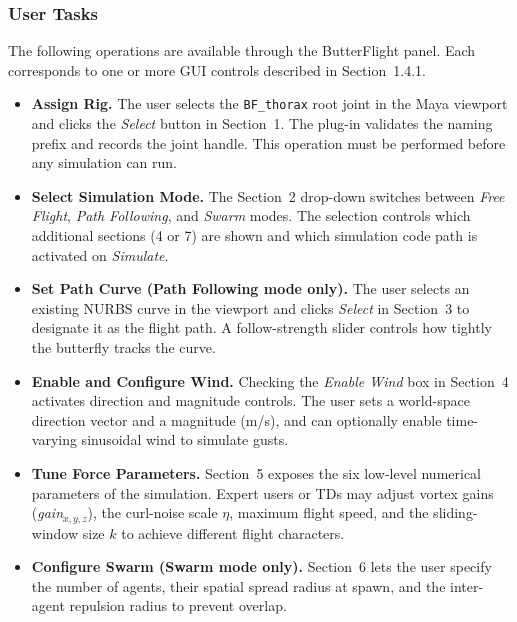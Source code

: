 \documentclass[12pt]{article}
\begin{document}
\subsubsection{User Tasks}

The following operations are available through the ButterFlight panel. Each corresponds
to one or more GUI controls described in Section~1.4.1.

\begin{itemize}
  \item \textbf{Assign Rig.} The user selects the \texttt{BF\_thorax} root joint in the
    Maya viewport and clicks the \textit{Select} button in Section~1. The plug-in validates
    the naming prefix and records the joint handle. This operation must be performed before
    any simulation can run.

  \item \textbf{Select Simulation Mode.} The Section~2 drop-down switches between
    \textit{Free Flight}, \textit{Path Following}, and \textit{Swarm} modes. The selection
    controls which additional sections (4 or 7) are shown and which simulation code path
    is activated on \textit{Simulate}.

  \item \textbf{Set Path Curve (Path Following mode only).} The user selects an existing
    NURBS curve in the viewport and clicks \textit{Select} in Section~3 to designate it
    as the flight path. A follow-strength slider controls how tightly the butterfly tracks
    the curve.

  \item \textbf{Enable and Configure Wind.} Checking the \textit{Enable Wind} box in
    Section~4 activates direction and magnitude controls. The user sets a world-space
    direction vector and a magnitude (m/s), and can optionally enable time-varying
    sinusoidal wind to simulate gusts.

  \item \textbf{Tune Force Parameters.} Section~5 exposes the six low-level numerical
    parameters of the simulation. Expert users or TDs may adjust vortex gains
    (\textit{gain}$_{x,y,z}$), the curl-noise scale $\eta$, maximum flight speed, and
    the sliding-window size $k$ to achieve different flight characters.

  \item \textbf{Configure Swarm (Swarm mode only).} Section~6 lets the user specify the
    number of agents, their spatial spread radius at spawn, and the inter-agent repulsion
    radius to prevent overlap.


\end{itemize}
\end{document}
